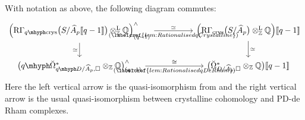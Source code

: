 \documentclass[DIV=12,numbers=enddot,leqno,bibliography=totoc]{scrartcl}
\begin{document}
	\begin{lem}\label{lem:CompatibilityCheck}
		With notation as above, the following diagram commutes:
		\begin{equation*}
			\begin{tikzcd}[column sep=huge]
				\left(\R\Gamma_\qcrys\bigl(S/\widehat{A}_p\qpower\bigr)\lotimes_{\IZ}\IQ\right)_{(q-1)}^\complete\rar["\simeq","{(\labelcref{lem:RationalisedqCrystalline})}"']\dar["\simeq"'] & \left(\R\Gamma_\crys\bigl(S/\widehat{A}_p\bigr)\lotimes_{\IZ}\IQ\right)\qpower\dar["\simeq"]\\
				\bigl(\q\breve{\Omega}_{\q D/\smash{\widehat{A}}_p, \square}^*\otimes_{\IZ}\IQ\bigr)_{(q-1)}^\complete \rar["\cong","{(\labelcref{lem:RationalisedqDeRham})}"'] & \bigl(\breve{\Omega}_{D/\smash{\widehat{A}}_p, \square}^*\otimes_{\IZ}\IQ\bigr)\qpower
			\end{tikzcd}
		\end{equation*}
		Here the left vertical arrow is the quasi-isomorphism from \cite[Theorem~\textup{}]{Prismatic} and the right vertical arrow is the usual quasi-isomorphism between crystalline cohomology and PD-de Rham complexes.
	\end{lem}
\end{document}
